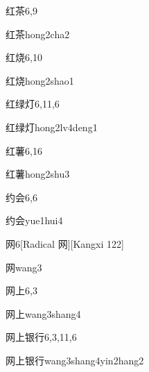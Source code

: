 \begin{entry}{红茶}{6,9}
  \begin{phonetics}{红茶}{hong2cha2}
  \end{phonetics}
\end{entry}

\begin{entry}{红烧}{6,10}
  \begin{phonetics}{红烧}{hong2shao1}
  \end{phonetics}
\end{entry}

\begin{entry}{红绿灯}{6,11,6}
  \begin{phonetics}{红绿灯}{hong2lv4deng1}
  \end{phonetics}
\end{entry}

\begin{entry}{红薯}{6,16}
  \begin{phonetics}{红薯}{hong2shu3}
  \end{phonetics}
\end{entry}

\begin{entry}{约会}{6,6}
  \begin{phonetics}{约会}{yue1hui4}
  \end{phonetics}
\end{entry}

\begin{entry}{网}{6}[Radical 网][Kangxi 122]
  \begin{phonetics}{网}{wang3}
  \end{phonetics}
\end{entry}

\begin{entry}{网上}{6,3}
  \begin{phonetics}{网上}{wang3shang4}
  \end{phonetics}
\end{entry}

\begin{entry}{网上银行}{6,3,11,6}
  \begin{phonetics}{网上银行}{wang3shang4yin2hang2}
  \end{phonetics}
\end{entry}

